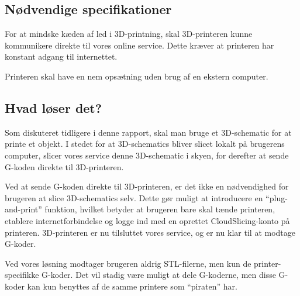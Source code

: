 


\subsection{Nødvendige specifikationer} %
\label{sub:krav_til_3d_teknologien}

For at mindske kæden af led i 3D-printning, skal 3D-printeren kunne kommunikere direkte til vores online service. Dette kræver at printeren har konstant adgang til internettet.

Printeren skal have en nem opsætning uden brug af en ekstern computer.


\subsection{Hvad løser det?} %
\label{sub:hvad_l_ser_det_}

Som diskuteret tidligere i denne rapport, skal man bruge et 3D-schematic for at printe et objekt. I stedet for at 3D-schematics bliver slicet lokalt på brugerens computer, slicer vores service denne 3D-schematic i skyen, for derefter at sende G-koden direkte til 3D-printeren. 

Ved at sende G-koden direkte til 3D-printeren, er det ikke en nødvendighed for brugeren at slice 3D-schematics selv. Dette gør muligt at introducere en ``plug-and-print'' funktion, hvilket betyder at brugeren bare skal tænde printeren, etablere internetforbindelse og logge ind med en oprettet CloudSlicing-konto på printeren. 3D-printeren er nu tilsluttet vores service, og er nu klar til at modtage G-koder.

Ved vores løsning modtager brugeren aldrig STL-filerne, men kun de printer-specifikke G-koder. Det vil stadig være muligt at dele G-koderne, men disse G-koder kan kun benyttes af de samme printere som ``piraten'' har.





